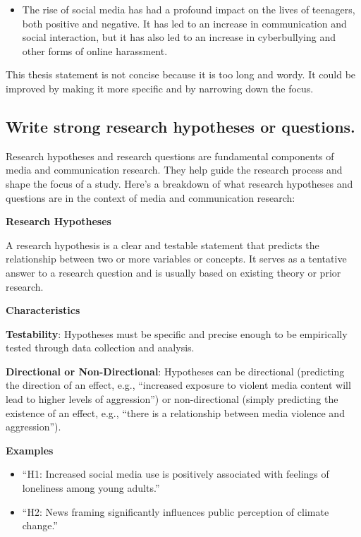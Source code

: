 \documentclass[
  b5paper]{book}
\providecommand{\tightlist}{%
  \setlength{\itemsep}{0pt}\setlength{\parskip}{0pt}}
\begin{document}
\begin{itemize}
\tightlist
\item
  The rise of social media has had a profound impact on the lives of teenagers, both positive and negative. It has led to an increase in communication and social interaction, but it has also led to an increase in cyberbullying and other forms of online harassment.
\end{itemize}

This thesis statement is not concise because it is too long and wordy. It could be improved by making it more specific and by narrowing down the focus.

\hypertarget{write-strong-research-hypotheses-or-questions.}{%
\subsection*{Write strong research hypotheses or questions.}\label{write-strong-research-hypotheses-or-questions.}}

Research hypotheses and research questions are fundamental components of media and communication research. They help guide the research process and shape the focus of a study. Here's a breakdown of what research hypotheses and questions are in the context of media and communication research:

\textbf{Research Hypotheses}

A research hypothesis is a clear and testable statement that predicts the relationship between two or more variables or concepts. It serves as a tentative answer to a research question and is usually based on existing theory or prior research.

\textbf{Characteristics}

\textbf{Testability}: Hypotheses must be specific and precise enough to be empirically tested through data collection and analysis.

\textbf{Directional or Non-Directional}: Hypotheses can be directional (predicting the direction of an effect, e.g., ``increased exposure to violent media content will lead to higher levels of aggression'') or non-directional (simply predicting the existence of an effect, e.g., ``there is a relationship between media violence and aggression'').

\textbf{Examples}

\begin{itemize}
\item
  ``H1: Increased social media use is positively associated with feelings of loneliness among young adults.''
\item
  ``H2: News framing significantly influences public perception of climate change.''
\end{itemize}
\end{document}
